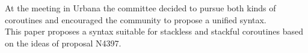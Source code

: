 At the meeting in Urbana the committee decided to pursue both kinds of
coroutines and encouraged the community to propose a unified syntax.\\
This paper proposes a syntax suitable for stackless and stackful coroutines
based on the ideas of proposal N4397\cite{N4397}.
